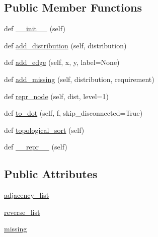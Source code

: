 \subsection*{Public Member Functions}
\begin{DoxyCompactItemize}
\item 
def \hyperlink{classpip_1_1__vendor_1_1distlib_1_1database_1_1DependencyGraph_a3bfb8f60f329fbb0263f426f0199498c}{\+\_\+\+\_\+init\+\_\+\+\_\+} (self)
\item 
def \hyperlink{classpip_1_1__vendor_1_1distlib_1_1database_1_1DependencyGraph_a7f6602ca9050ec3c01cdf446f7b30665}{add\+\_\+distribution} (self, distribution)
\item 
def \hyperlink{classpip_1_1__vendor_1_1distlib_1_1database_1_1DependencyGraph_aad458a901fef164e4b4d26d162ef4ab7}{add\+\_\+edge} (self, x, y, label=None)
\item 
def \hyperlink{classpip_1_1__vendor_1_1distlib_1_1database_1_1DependencyGraph_a372a05efe7243ce822e03da20181f7e6}{add\+\_\+missing} (self, distribution, requirement)
\item 
def \hyperlink{classpip_1_1__vendor_1_1distlib_1_1database_1_1DependencyGraph_ae34e4ffde44d8f82b4ca446e51c81a2c}{repr\+\_\+node} (self, dist, level=1)
\item 
def \hyperlink{classpip_1_1__vendor_1_1distlib_1_1database_1_1DependencyGraph_a781f2bf3dce5bbc552bdb7f5fd6b5e9b}{to\+\_\+dot} (self, f, skip\+\_\+disconnected=True)
\item 
def \hyperlink{classpip_1_1__vendor_1_1distlib_1_1database_1_1DependencyGraph_af79cfdb1bc73ef831fb4e05affd7af7b}{topological\+\_\+sort} (self)
\item 
def \hyperlink{classpip_1_1__vendor_1_1distlib_1_1database_1_1DependencyGraph_a552032dc5099b46a72a7542fc28c4bd8}{\+\_\+\+\_\+repr\+\_\+\+\_\+} (self)
\end{DoxyCompactItemize}
\subsection*{Public Attributes}
\begin{DoxyCompactItemize}
\item 
\hyperlink{classpip_1_1__vendor_1_1distlib_1_1database_1_1DependencyGraph_ab09458adced85d979e12319d4a76a80e}{adjacency\+\_\+list}
\item 
\hyperlink{classpip_1_1__vendor_1_1distlib_1_1database_1_1DependencyGraph_aa3df0f0e44cb028bbd4b86159a8043c6}{reverse\+\_\+list}
\item 
\hyperlink{classpip_1_1__vendor_1_1distlib_1_1database_1_1DependencyGraph_ae7a49b57f8dc50445e4fbc129c90f7e5}{missing}
\end{DoxyCompactItemize}


